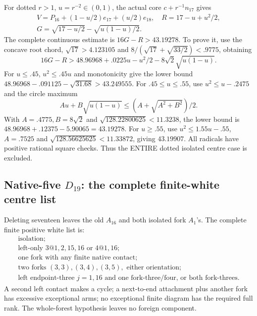 \documentclass[11pt]{article}
\theoremstyle{definition}
\theoremstyle{remark}
\begin{document}
For dotted \(r>1\),
\(u=r^{-2}\in(0,1)\), the actual
core \(c+r^{-1}n_{17}\) gives
\[
\begin{gathered}
 V=P_{16}+(1-u/2)e_{17}+(u/2)e_{18},\quad
 R=17-u+u^2/2,\\
 G=\sqrt{17-u/2}-\sqrt{u(1-u)/2}.
\end{gathered}
\]
The complete continuous estimate
is \(16G-R>43.19278\).
To prove it, use the concave
root chord, \(\sqrt{17}>4.123105\)
and
\(8/(\sqrt{17}+\sqrt{33/2})<.9775\),
obtaining
\[
 16G-R>48.96968+.0225u-u^2/2
                                  -8\sqrt2\sqrt{u(1-u)} .
\]
For \(u\le.45\), \(u^2\le.45u\)
and monotonicity give the lower
bound
\(48.96968-.091125-\sqrt{31.68}
>43.249555\).
For \(.45\le u\le.55\),
use \(u^2\le u-.2475\) and
the circle maximum
\[
 Au+B\sqrt{u(1-u)}
                         \le(A+\sqrt{A^2+B^2})/2 .
\]
With \(A=.4775,B=8\sqrt2\) and
\(\sqrt{128.22800625}<11.3238\),
the lower bound is
\(48.96968+.12375-5.90065=43.19278\).
For \(u\ge.55\), use
\(u^2\le1.55u-.55\),
\(A=.7525\) and
\(\sqrt{128.56625625}<11.33872\),
giving \(43.19907\).
All radicals have positive
rational square checks.
Thus the ENTIRE dotted isolated
centre case is excluded.

\subsection[Native-five D19: the complete finite-white centre list]{Native-five \(D_{19}\): the complete finite-white centre list}
\label{app:exact19:Dfivecentrelist}

Deleting seventeen leaves the
old \(A_{16}\) and both isolated
fork \(A_1\)'s.
The complete finite positive
white list is:
\[
\begin{array}{l}
 \text{isolation};\\
 \text{left-only }3@1,2,15,16\text{ or }4@1,16;\\
 \text{one fork with any finite native contact};\\
 \text{two forks }(3,3),(3,4),(3,5),\text{ either orientation};\\
 \text{left endpoint-three }j=1,16\text{ and one fork-three/four,
 or both fork-threes}.
\end{array}
\]
A second left contact makes a
cycle; a next-to-end attachment
plus another fork has excessive
exceptional arms; no exceptional
finite diagram has the required
full rank.
The whole-forest hypothesis
leaves no foreign component.
\end{document}
